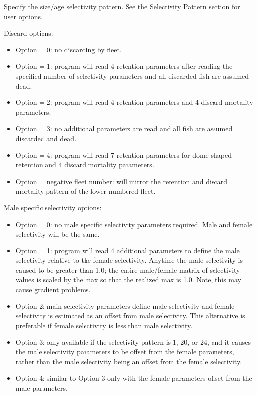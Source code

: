 Specify the size/age selectivity pattern. See the \hyperlink{SelexPattern}{Selectivity Pattern} section for user options.

\hypertarget{DomeRetention}{}
Discard options:
\begin{itemize}
	\item Option = 0: no discarding by fleet.
	\item Option = 1: program will read 4 retention parameters after reading the specified number of selectivity parameters and all discarded fish are assumed dead.
	\item Option = 2: program will read 4 retention parameters and 4 discard mortality parameters.
	\item Option = 3: no additional parameters are read and all fish are assumed discarded and dead.
	\item Option = 4: program will read 7 retention parameters for dome-shaped retention and 4 discard mortality parameters.
	\item Option = negative fleet number: will mirror the retention and discard mortality pattern of the lower numbered fleet.
\end{itemize}

Male specific selectivity options:
\begin{itemize}
	\item Option = 0: no male specific selectivity parameters required. Male and female selectivity will be the same.
	\item Option = 1: program will read 4 additional parameters to define the male selectivity relative to the female selectivity. Anytime the male selectivity is caused to be greater than 1.0; the entire male/female matrix of selectivity values is scaled by the max so that the realized max is 1.0. Note, this may cause gradient problems.
	\item Option 2: main selectivity parameters define male selectivity and female selectivity is estimated as an offset from male selectivity. This alternative is preferable if female selectivity is less than male selectivity.
	\item Option 3: only available if the selectivity pattern is 1, 20, or 24, and it causes the male selectivity parameters to be offset from the female parameters, rather than the male selectivity being an offset from the female selectivity.
	\item Option 4: similar to Option 3 only with the female parameters offset from the male parameters.
\end{itemize}

